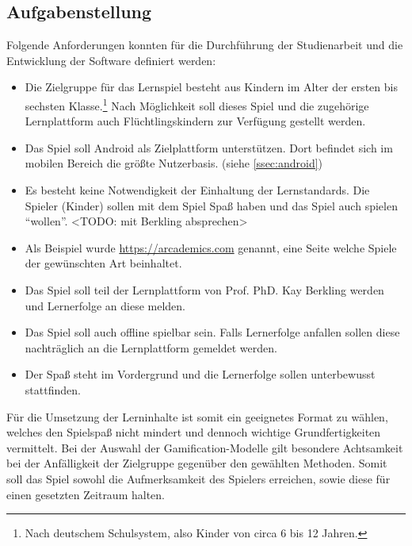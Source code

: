 \subsection{Aufgabenstellung}
	Folgende Anforderungen konnten für die Durchführung der Studienarbeit und die Entwicklung der Software definiert werden:
	\begin{itemize}
		\item{ Die Zielgruppe für das Lernspiel besteht aus Kindern im Alter der ersten bis sechsten Klasse.\footnote{Nach deutschem Schulsystem, also Kinder von circa 6 bis 12 Jahren.} Nach Möglichkeit soll dieses Spiel und die zugehörige Lernplattform auch Flüchtlingskindern zur Verfügung gestellt werden. }
		\item{ Das Spiel soll Android als Zielplattform unterstützen. Dort befindet sich im mobilen Bereich die größte Nutzerbasis. (siehe \ref{ssec:android}) }
		\item{ Es besteht keine Notwendigkeit der Einhaltung der Lernstandards. Die Spieler (Kinder) sollen mit dem Spiel Spaß haben und das Spiel auch spielen \enquote{wollen}. <TODO: mit Berkling absprechen> }
		\item{ Als Beispiel wurde \url{https://arcademics.com} genannt, eine Seite welche Spiele der gewünschten Art beinhaltet. }
		\item{ Das Spiel soll teil der Lernplattform von Prof. PhD. Kay Berkling werden und Lernerfolge an diese melden. }
		\item{ Das Spiel soll auch offline spielbar sein. Falls Lernerfolge anfallen sollen diese nachträglich an die Lernplattform gemeldet werden. }
		\item{ Der Spaß steht im Vordergrund und die Lernerfolge sollen unterbewusst stattfinden. }
	\end{itemize}
	Für die Umsetzung der Lerninhalte ist somit ein geeignetes Format zu wählen, welches den Spielspaß nicht mindert und dennoch wichtige Grundfertigkeiten vermittelt.
	Bei der Auswahl der Gamification-Modelle gilt besondere Achtsamkeit bei der Anfälligkeit der Zielgruppe gegenüber den gewählten Methoden. Somit soll das Spiel sowohl die Aufmerksamkeit des Spielers erreichen, sowie diese für einen gesetzten Zeitraum halten.

